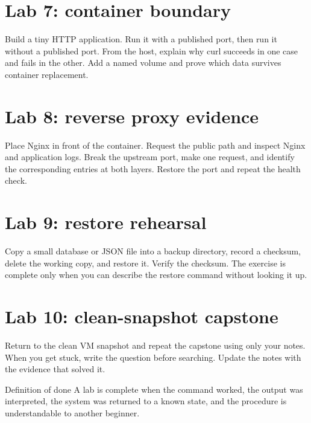 \documentclass[11pt,a4paper,openany]{book}
\begin{document}
\section{Lab 7: container boundary}
Build a tiny HTTP application. Run it with a published port, then run it without a published port. From the host, explain why curl succeeds in one case and fails in the other. Add a named volume and prove which data survives container replacement.
\section{Lab 8: reverse proxy evidence}
Place Nginx in front of the container. Request the public path and inspect Nginx and application logs. Break the upstream port, make one request, and identify the corresponding entries at both layers. Restore the port and repeat the health check.
\section{Lab 9: restore rehearsal}
Copy a small database or JSON file into a backup directory, record a checksum, delete the working copy, and restore it. Verify the checksum. The exercise is complete only when you can describe the restore command without looking it up.
\section{Lab 10: clean-snapshot capstone}
Return to the clean VM snapshot and repeat the capstone using only your notes. When you get stuck, write the question before searching. Update the notes with the evidence that solved it.
\begin{mentalbox}{Definition of done}
A lab is complete when the command worked, the output was interpreted, the system was returned to a known state, and the procedure is understandable to another beginner.
\end{mentalbox}

\appendix
\end{document}
